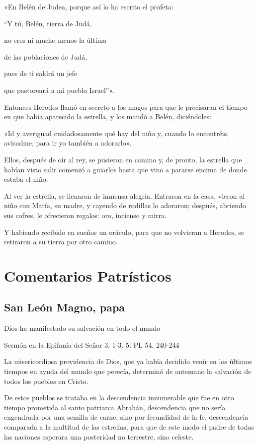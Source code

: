 «En Belén de Judea, porque así lo ha escrito el profeta:

``Y tú, Belén, tierra de Judá,

no eres ni mucho menos la última

de las poblaciones de Judá,

pues de ti saldrá un jefe

que pastoreará a mi pueblo Israel''».

Entonces Herodes llamó en secreto a los magos para que le precisaran el
tiempo en que había aparecido la estrella, y los mandó a Belén,
diciéndoles:

«Id y averiguad cuidadosamente qué hay del niño y, cuando lo encontréis,
avisadme, para ir yo también a adorarlo».

Ellos, después de oír al rey, se pusieron en camino y, de pronto, la
estrella que habían visto salir comenzó a guiarlos hasta que vino a
pararse encima de donde estaba el niño.

Al ver la estrella, se llenaron de inmensa alegría. Entraron en la casa,
vieron al niño con María, su madre, y cayendo de rodillas lo adoraron;
después, abriendo sus cofres, le ofrecieron regalos: oro, incienso y
mirra.

Y habiendo recibido en sueños un oráculo, para que no volvieran a
Herodes, se retiraron a su tierra por otro
camino.

\section{Comentarios Patrísticos}

\subsection{San León Magno, papa}

Dios ha manifestado su salvación en todo el mundo

Sermón en la Epifanía del Señor 3, 1-3. 5: PL 54, 240-244

La misericordiosa providencia de Dios, que ya había decidido venir en los últimos tiempos en ayuda del mundo que perecía, determinó de antemano la salvación de todos los pueblos en Cristo.

De estos pueblos se trataba en la descendencia innumerable que fue en otro tiempo prometida al santo patriarca Abrahán, descendencia que no sería engendrada por una semilla de carne, sino por fecundidad de la fe, descendencia comparada a la multitud de las estrellas, para que de este modo el padre de todas las naciones esperara una posteridad no terrestre, sino celeste.

